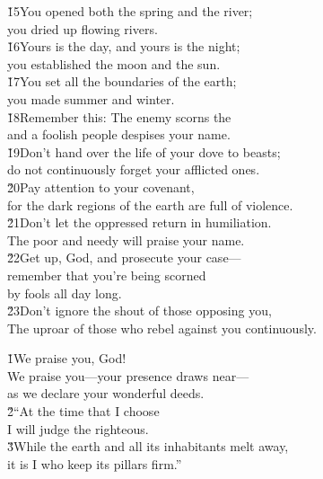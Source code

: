 \begin{poetry}
\poeml \v{15}You opened both the spring and the river; \\
\poemll    you dried up flowing rivers. \\
\poeml \v{16}Yours is the day, and yours is the night; \\
\poemll    you established the moon and the sun. \\
\poeml \v{17}You set all the boundaries of the earth; \\
\poemll    you made summer and winter. \\
\poeml \v{18}Remember this: The enemy scorns the  \\
\poemll    and a foolish people despises your name. \\
\poeml \v{19}Don't hand over the life of your dove to beasts; \\
\poemll    do not continuously forget your afflicted ones. \\
\poeml \v{20}Pay attention to your covenant, \\
\poemll    for the dark regions of the earth are full of violence. \\
\poeml \v{21}Don't let the oppressed return in humiliation. \\
\poemll    The poor and needy will praise your name. \\
\poeml \v{22}Get up, God, and prosecute your case--- \\
\poemll    remember that you're being scorned \\
\poemlll       by fools all day long. \\
\poeml \v{23}Don't ignore the shout of those opposing you, \\
\poemll    The uproar of those who rebel against you continuously.
\end{poetry}

\begin{poetry}
\poeml \v{1}We praise you, God! \\
\poemll    We praise you---your presence draws near--- \\
\poemlll       as we declare your wonderful deeds. \\
\poeml \v{2}``At the time that I choose \\
\poemll    I will judge the righteous. \\
\poeml \v{3}While the earth and all its inhabitants melt away, \\
\poemll    it is I who keep its pillars firm.''
\end{poetry}

